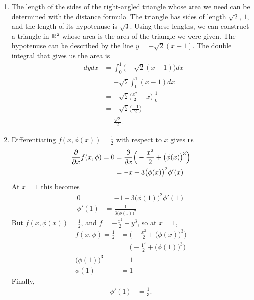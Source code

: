 \documentclass{article}
\begin{document}
\begin{enumerate}
\item %
The length of the sides of the right-angled triangle whose area we need can be determined with the distance formula. The triangle has sides of length $\sqrt{2}$, $1$, and the length of its hypotenuse is $\sqrt{3}$. Using these lengths, we can construct a triangle in $\mathbb{R}^2$ whose area is the area of the triangle we were given. The hypotenuse can be described by the line $y=-\sqrt{2}(x-1)$. The double integral that gives us the area is 
\begin{align*}
  \mathop{\int_0^1 \!\! \int_{0}^{-\sqrt{2}(x-1)}} dydx &= 
  \int_0^1 \Big(-\sqrt{2}(x-1)\Big)dx \\
  &= -\sqrt{2} \int_0^1 (x-1) dx \\
  &= -\sqrt{2} \Big(\frac{x^2}{2}-x\Big)\Big|_0^1 \\
  &= -\sqrt{2}\Big(\frac{-1}{2}\Big) \\
  &= \frac{\sqrt{2}}{2}.
\end{align*}
\item %
Differentiating $f(x,\phi(x))=\frac{1}{2}$ with respect to $x$ gives us 
\begin{align*}
  \frac{\partial}{\partial x} f(x,\phi) = 0 &= \frac{\partial}{\partial x} \Big(-\frac{x^2}{2} + \big(\phi(x)\big)^3\Big)\\
  &= -x + 3\big(\phi(x)\big)^2\phi'(x)
\end{align*}
At $x=1$ this becomes
\begin{align*}
  0 &= -1 + 3\big(\phi(1)\big)^2\phi'(1)\\
  \phi'(1) &=\frac{1}{3\big(\phi(1)\big)^2}
\end{align*}
But $f(x,\phi(x))=\frac{1}{2}$, and $f=-\frac{x^2}{2}+y^3$, so at $x=1$,
\begin{align*}
  f(x,\phi) = \frac{1}{2} 
  &= \Big(-\frac{x^2}{2} + \big(\phi(x)\big)^3\Big)\\
  &= \Big(-\frac{1^2}{2} + \big(\phi(1)\big)^3\Big)\\
  \big(\phi(1)\big)^3 &= 1\\
  \phi(1) &= 1
\end{align*}
Finally,
\begin{align*}
  \phi'(1) &= \frac{1}{3}.
\end{align*}

\end{enumerate}
\end{document}
